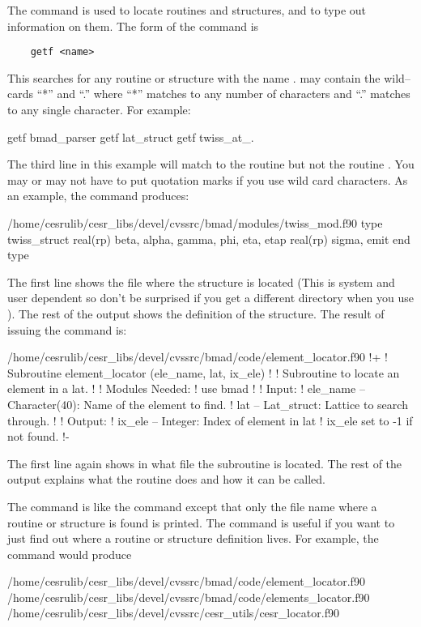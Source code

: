 The  command is used to locate routines and structures, and
to type out information on them.  The form of the command is
\begin{verbatim}
    getf <name>
\end{verbatim}
This searches for any routine or structure with the name
.  may contain the wild--cards ``*'' and ``.'' where
``*'' matches to any number of characters and ``.'' matches to any
single character. For example:
\begin{example}
    getf bmad_parser
    getf lat_struct
    getf twiss_at_.
\end{example}
The third line in this example will match to the routine
 but not the routine . You may or
may not have to put quotation marks if you use wild card characters.
As an example, the command  produces:
\begin{example}
  /home/cesrulib/cesr_libs/devel/cvssrc/bmad/modules/twiss_mod.f90
    type twiss_struct
      real(rp) beta, alpha, gamma, phi, eta, etap
      real(rp) sigma, emit
    end type
\end{example}
The first line shows the file where the structure is located (This is
system and user dependent so don't be surprised if you get a different
directory when you use ). The rest of the output shows the
definition of the  structure.  The result of issuing
the command  is:
\begin{example}
  /home/cesrulib/cesr_libs/devel/cvssrc/bmad/code/element_locator.f90
  !+
  ! Subroutine element_locator (ele_name, lat, ix_ele)
  !
  ! Subroutine to locate an element in a lat. 
  !
  ! Modules Needed:
  !   use bmad
  !
  ! Input:
  !   ele_name -- Character(40): Name of the element to find.
  !   lat      -- Lat_struct: Lattice to search through.
  !
  ! Output:
  !   ix_ele -- Integer: Index of element in lat%
  !               ix_ele set to -1 if not found.
  !-
\end{example}
The first line again shows in what file the subroutine is located.
The rest of the output explains what the routine does and how it
can be called.

The  command is like the  command except that only
the file name where a routine or structure is found is printed.
The  command is useful if you
want to just find out where a routine or structure definition lives.
For example, the  command would produce
\begin{example}
  /home/cesrulib/cesr_libs/devel/cvssrc/bmad/code/element_locator.f90
  /home/cesrulib/cesr_libs/devel/cvssrc/bmad/code/elements_locator.f90
  /home/cesrulib/cesr_libs/devel/cvssrc/cesr_utils/cesr_locator.f90
\end{example}

